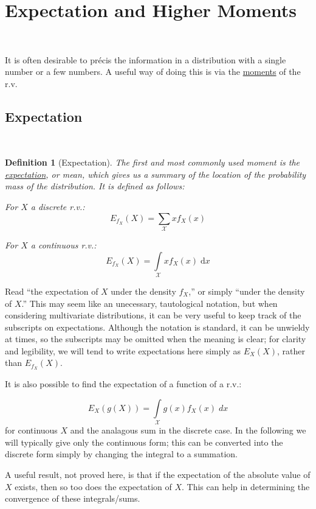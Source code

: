 \documentclass[12pt,a4paper]{article}
\newtheorem{defn}[thm]{Definition}
\begin{document}
\clearpage
\section{Expectation and Higher Moments}$\;$

It is often desirable to pr\'ecis the information in a distribution with a single number or a few numbers. A useful way of doing this is via the \underline{moments} of the r.v.

\subsection{Expectation}$\;$

\begin{defn}[Expectation]
\vspace{1cm}

The first and most commonly used moment is the \underline{expectation}, or mean, which gives us a summary of the location of the probability mass of the distribution. It is defined as follows:\par
\vspace{1cm}
\noindent For $X$ a discrete r.v.:
$$E_{f_X}(X) = \sum_{\mathcal{X}}x f_X(x)$$

\noindent For $X$ a continuous r.v.:
$$E_{f_X}(X) = \int\limits_{\mathcal{X}} x f_X(x)\; \mathrm{d}x$$

\end{defn}

Read ``the expectation of $X$ under the density $f_X$,'' or simply ``under the density of $X$.'' This may seem like an unecessary, tautological notation, but when considering multivariate distributions, it can be very useful to keep track of the subscripts on expectations. Although the notation is standard, it can be unwieldy at times, so the subscripts may be omitted when the meaning is clear; for clarity and legibility, we will tend to write expectations here simply as $E_X(X)$, rather than $E_{f_X}(X)$.

It is also possible to find the expectation of a function of a r.v.:

$$E_{X}(g(X)) = \int\limits_{\mathcal{X}} \!\!g(x) f_X(x)\; dx$$
for continuous $X$ and the analagous sum in the discrete case. In the following we will typically give only the continuous form; this can be converted into the discrete form simply by changing the integral to a summation.

A useful result, not proved here, is that if the expectation of the absolute value of $X$ exists, then so too does the expectation of $X$. This can help in determining the convergence of these integrals/sums.
\end{document}
